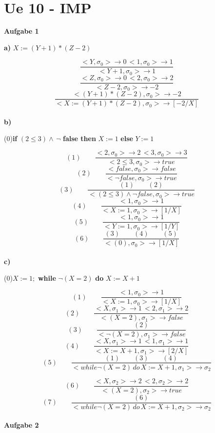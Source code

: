 \documentclass[fleqn]{article}
\begin{document}
\section{Ue 10 - IMP}

\noindent\textbf{Aufgabe 1}

\noindent \textbf{a)} $X:=(Y+1)*(Z-2)$

$$\frac{<Y,\sigma_0>\rightarrow0\,<1,\sigma_0>\rightarrow1}{<Y+1,\sigma_0>\rightarrow1}$$
$$\frac{<Z,\sigma_0>\rightarrow0\,<2,\sigma_0>\rightarrow2}{<Z-2,\sigma_0>\rightarrow-2}$$
$$\frac{<(Y+1)*(Z-2),\sigma_0>\rightarrow-2}{<X:=(Y+1)*(Z-2),\sigma_0>\rightarrow[-2/X]}$$
\\
\noindent \textbf{b)} 

\begin{center} (0)\qquad\textbf{if} $(2\leq 3) \wedge \,\neg$ \textbf{false then} $X:=1$ \textbf{else} $Y:=1$
\end{center}

$$(1)\qquad\frac{<2,\sigma_0>\rightarrow2\,<3,\sigma_0>\rightarrow3}{<2\leq 3,\sigma_0>\rightarrow true}$$
$$(2)\qquad\frac{<false,\sigma_0>\rightarrow false}{<\neg false,\sigma_0>\rightarrow true}$$
$$(3)\qquad\frac{(1)\qquad(2)}{<(2\leq 3)\wedge \neg false,\sigma_0>\rightarrow true}$$
$$(4)\qquad\frac{<1,\sigma_0>\rightarrow 1}{<X:=1,\sigma_0>\rightarrow[1/X]}$$
$$(5)\qquad\frac{<1,\sigma_0>\rightarrow 1}{<Y:=1,\sigma_0>\rightarrow[1/Y]}$$
$$(6)\qquad\frac{(3)\qquad(4)\qquad(5)}{<(0),\sigma_0>\rightarrow[1/X]}$$
\\
\noindent \textbf{c)} 

\begin{center}
    (0)\qquad    $X:=1;$ \textbf{while} $\neg (X = 2)$ \textbf{do} $X:=X+1$
\end{center}

$$(1)\qquad \frac{<1,\sigma_0>\rightarrow1}{<X:=1,\sigma_0>\rightarrow[1/X]}$$
$$(2)\qquad\frac{<X,\sigma_1>\rightarrow1\,<2,\sigma_1>\rightarrow2}{<(X=2),\sigma_1>\rightarrow false}$$
$$(3)\qquad\frac{(2)}{<\neg (X=2),\sigma_1>\rightarrow false}$$
$$(4)\qquad\frac{<X,\sigma_1>\rightarrow1\,<1,\sigma_1>\rightarrow1}{<X:=X+1,\sigma_1>\rightarrow[2/X]}$$
$$(5)\qquad\frac{(1)\qquad(3)\qquad(4)}{<while\neg(X=2)\,do\,X:=X+1,\sigma_1>\rightarrow\sigma_2}$$

$$(6)\qquad\frac{<X,\sigma_2>\rightarrow2\,<2,\sigma_2>\rightarrow2}{<(X=2),\sigma_2>\rightarrow true}$$
$$(7)\qquad\frac{(6)}{<while\neg(X=2)\,do\,X:=X+1,\sigma_2>\rightarrow\sigma_2}$$
\\
\noindent\textbf{Aufgabe 2}
\end{document}
